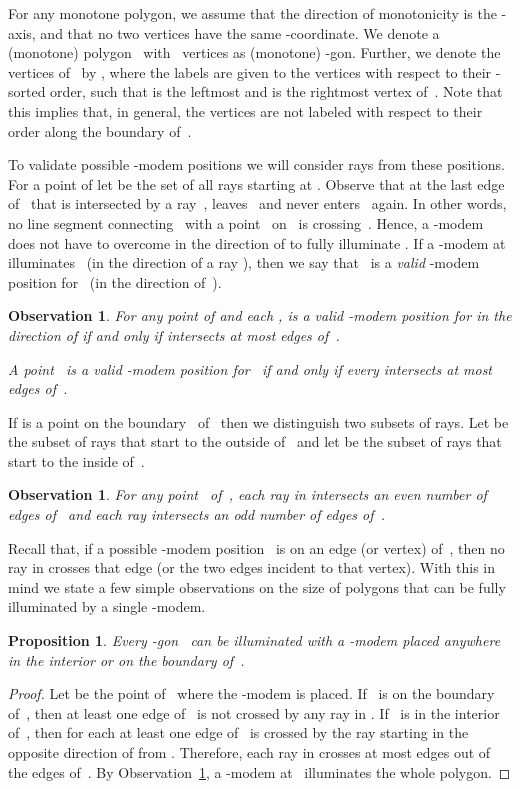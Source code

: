 \documentclass[A4]{article}
\newtheorem{proposition}[theorem]{Proposition}
\newtheorem{observation}[theorem]{Observation}
\begin{document}
For any monotone polygon, we assume that the direction of monotonicity is the \mbox{-axis}, and that no two vertices have the same -coordinate.
We denote a (monotone) polygon~ with~ vertices as (monotone) \mbox{-gon}.
Further, we denote the vertices of~ by , where the labels are given to the vertices with respect to their -sorted order, such that  is the leftmost and  is the rightmost vertex of~.
Note that this implies that, in general, the vertices are not labeled with respect to their order along the boundary of~. 


To validate possible \mbox{-modem} positions we will consider rays from these positions.
For a point  of  let  be the set of all rays starting at .
Observe that at the last edge~ of~ that is intersected by a ray~,  leaves~ and never enters~ again.
In other words, no line segment connecting~ with a point~ on~ is crossing~.
Hence, a \mbox{-modem} does not have to overcome  in the direction of  to fully illuminate .
If a \mbox{-modem} at  illuminates~ (in the direction of a ray ), then we say that~ is a \emph{valid} \mbox{-modem} position for~ (in the direction of~).


\begin{observation}\label{obs:rayk+1}
For any point  of  and each ,  is a valid \mbox{-modem} position for  in the direction of  if and only if  intersects at most  edges of~.

A point~ is a valid \mbox{-modem} position for~ if and only if every  intersects at most  edges of~.
\end{observation}

If  is a point on the boundary~ of~ then we distinguish two subsets of rays.
Let  be the subset of rays that start to the outside of~ and let  be the subset of rays that start to the inside of~.

\begin{observation}\label{obs:rayio}
For any point~ of~, each ray in  intersects an even number of edges of~ and each ray  intersects an odd number of edges of~.
\end{observation}


Recall that, if a possible \mbox{-modem} position~ is on an edge (or vertex) of~, then no ray in  crosses that edge (or the two edges incident to that vertex).
With this in mind we state a few simple observations on the size of polygons that can be fully illuminated by a single \mbox{-modem}.

\begin{proposition}\label{prop:anywhere}
Every -gon~ can be illuminated with a \mbox{-modem} placed anywhere in the interior or on the boundary of~.
\end{proposition}
\begin{proof}
  Let  be the point of~ where the \mbox{-modem} is placed.
  If~ is on the boundary of~, then at least one edge of~ is not crossed by any ray in .
  If~ is in the interior of~, then for each  at least one edge of~ is crossed by the ray starting in the opposite direction of  from .
Therefore, each ray in  crosses at most  edges out of the  edges of~.
By Observation~\ref{obs:rayk+1}, a \mbox{-modem} at~ illuminates the whole polygon. \end{proof}
\end{document}
